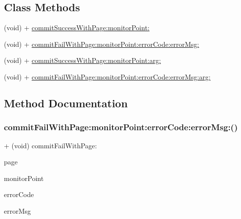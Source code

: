 \subsection*{Class Methods}
\begin{DoxyCompactItemize}
\item 
(void) + \mbox{\hyperlink{interface_app_monitor_alarm_a40638ef87e4dc3ddb4257f27a814c7d7}{commit\+Success\+With\+Page\+:monitor\+Point\+:}}
\item 
(void) + \mbox{\hyperlink{interface_app_monitor_alarm_a680e95cfe69df635a2bbd432169de606}{commit\+Fail\+With\+Page\+:monitor\+Point\+:error\+Code\+:error\+Msg\+:}}
\item 
(void) + \mbox{\hyperlink{interface_app_monitor_alarm_a923c987b5a2b62df4067735e375271eb}{commit\+Success\+With\+Page\+:monitor\+Point\+:arg\+:}}
\item 
(void) + \mbox{\hyperlink{interface_app_monitor_alarm_a3ab1334e5d2ed3803425cca2d5b0ae8a}{commit\+Fail\+With\+Page\+:monitor\+Point\+:error\+Code\+:error\+Msg\+:arg\+:}}
\end{DoxyCompactItemize}


\subsection{Method Documentation}
\mbox{\label{interface_app_monitor_alarm_a680e95cfe69df635a2bbd432169de606}} 
\subsubsection{\texorpdfstring{commit\+Fail\+With\+Page\+:monitor\+Point\+:error\+Code\+:error\+Msg\+:()}{commitFailWithPage:monitorPoint:errorCode:errorMsg:()}}
{\footnotesize\ttfamily + (void) commit\+Fail\+With\+Page\+: \begin{DoxyParamCaption}\item[{(N\+S\+String $\ast$)}]{page }\item[{monitorPoint:(N\+S\+String $\ast$)}]{monitor\+Point }\item[{errorCode:(N\+S\+String $\ast$)}]{error\+Code }\item[{errorMsg:(N\+S\+String $\ast$)}]{error\+Msg }\end{DoxyParamCaption}}


